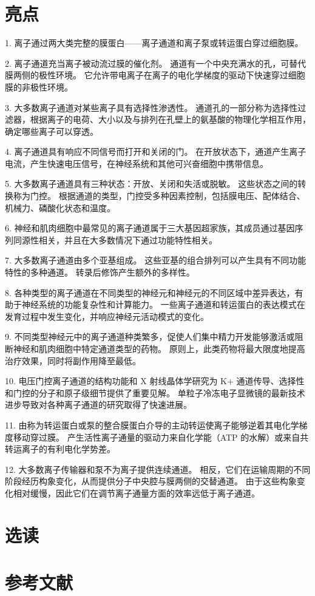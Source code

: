 \section{亮点}


1. 离子通过两大类完整的膜蛋白——离子通道和离子泵或转运蛋白穿过细胞膜。 


2. 离子通道充当离子被动流过膜的催化剂。 
通道有一个中央充满水的孔，可替代膜两侧的极性环境。 
它允许带电离子在离子的电化学梯度的驱动下快速穿过细胞膜的非极性环境。 


3. 大多数离子通道对某些离子具有选择性渗透性。 
通道孔的一部分称为选择性过滤器，根据离子的电荷、大小以及与排列在孔壁上的氨基酸的物理化学相互作用，确定哪些离子可以穿透。 


4. 离子通道具有响应不同信号而打开和关闭的门。 
在开放状态下，通道产生离子电流，产生快速电压信号，在神经系统和其他可兴奋细胞中携带信息。 


5. 大多数离子通道具有三种状态：开放、关闭和失活或脱敏。 
这些状态之间的转换称为门控。 
根据通道的类型，门控受多种因素控制，包括膜电压、配体结合、机械力、磷酸化状态和温度。 


6. 神经和肌肉细胞中最常见的离子通道属于三大基因超家族，其成员通过基因序列同源性相关，并且在大多数情况下通过功能特性相关。 


7. 大多数离子通道由多个亚基组成。 
这些亚基的组合排列可以产生具有不同功能特性的多种通道。 转录后修饰产生额外的多样性。 


8. 各种类型的离子通道在不同类型的神经元和神经元的不同区域中差异表达，有助于神经系统的功能复杂性和计算能力。 
一些离子通道和转运蛋白的表达模式在发育过程中发生变化，并响应神经元活动模式的变化。 


9. 不同类型神经元中的离子通道种类繁多，促使人们集中精力开发能够激活或阻断神经和肌肉细胞中特定通道类型的药物。 
原则上，此类药物将最大限度地提高治疗效果，同时将副作用降至最低。 


10. 电压门控离子通道的结构功能和 X 射线晶体学研究为 K+ 通道传导、选择性和门控的分子和原子级细节提供了重要见解。 
单粒子冷冻电子显微镜的最新技术进步导致对各种离子通道的研究取得了快速进展。 


11. 由称为转运蛋白或泵的整合膜蛋白介导的主动转运使离子能够逆着其电化学梯度移动穿过膜。 
产生活性离子通量的驱动力来自化学能（ATP 的水解）或来自共转运离子的有利电化学势差。 


12. 大多数离子传输器和泵不为离子提供连续通道。 
相反，它们在运输周期的不同阶段经历构象变化，从而提供分子中央腔与膜两侧的交替通道。 
由于这些构象变化相对缓慢，因此它们在调节离子通量方面的效率远低于离子通道。


\section{选读}

\section{参考文献}
